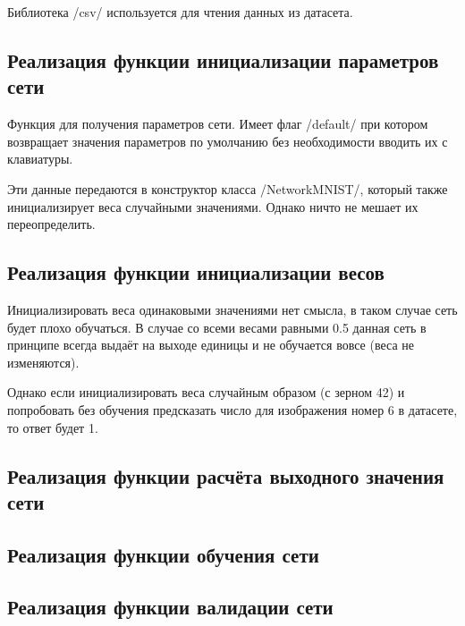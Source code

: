 \documentclass[14pt]{extarticle}
\begin{document}
    Библиотека \pythoninline/csv/ используется для чтения данных из датасета.

    \subsection{Реализация функции инициализации параметров сети}
    Функция для получения параметров сети. Имеет флаг \pythoninline/default/ при котором возвращает
    значения параметров по умолчанию без необходимости вводить их с клавиатуры.

    Эти данные передаются в конструктор класса \pythoninline/NetworkMNIST/, который также инициализирует
    веса случайными значениями. Однако ничто не мешает их переопределить.

    \subsection{Реализация функции инициализации весов}
    Инициализировать веса одинаковыми значениями нет смысла, в таком случае сеть будет плохо обучаться.
    В случае со всеми весами равными 0.5 данная сеть в принципе всегда выдаёт на выходе единицы и не обучается вовсе (веса
    не изменяются).

    Однако если инициализировать веса случайным образом (с зерном 42) и попробовать без обучения предсказать число для
    изображения номер 6 в датасете, то ответ будет 1.

    \subsection{Реализация функции расчёта выходного значения сети}

    \subsection{Реализация функции обучения сети}

    \subsection{Реализация функции валидации сети}
\end{document}
